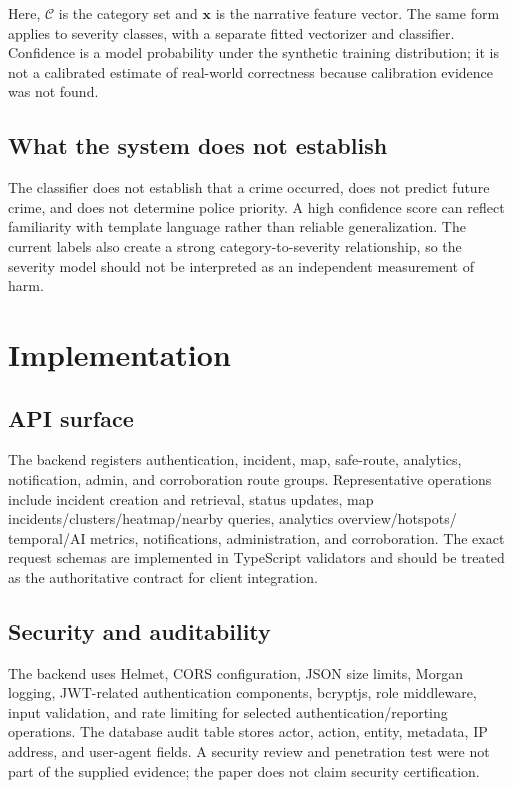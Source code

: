 \documentclass[11pt]{article}
\begin{document}
Here, $\mathcal{C}$ is the category set and $\boldsymbol{x}$ is the
narrative feature vector. The same form applies to severity classes, with a
separate fitted vectorizer and classifier. Confidence is a model probability
under the synthetic training distribution; it is not a calibrated estimate
of real-world correctness because calibration evidence was not found.

\subsection{What the system does not establish}

The classifier does not establish that a crime occurred, does not predict
future crime, and does not determine police priority. A high confidence
score can reflect familiarity with template language rather than reliable
generalization. The current labels also create a strong category-to-severity
relationship, so the severity model should not be interpreted as an
independent measurement of harm.

\section{Implementation}
\label{sec:implementation}

\subsection{API surface}

The backend registers authentication, incident, map, safe-route, analytics,
notification, admin, and corroboration route groups. Representative
operations include incident creation and retrieval, status updates,
map incidents/clusters/heatmap/nearby queries, analytics overview/hotspots/
temporal/AI metrics, notifications, administration, and corroboration.
The exact request schemas are implemented in TypeScript validators and
should be treated as the authoritative contract for client integration.

\subsection{Security and auditability}

The backend uses Helmet, CORS configuration, JSON size limits, Morgan
logging, JWT-related authentication components, bcryptjs, role middleware,
input validation, and rate limiting for selected authentication/reporting
operations. The database audit table stores actor, action, entity,
metadata, IP address, and user-agent fields. A security review and
penetration test were not part of the supplied evidence; the paper does not
claim security certification.
\end{document}
